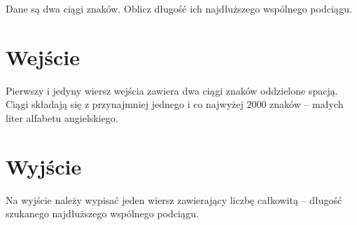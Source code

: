\documentclass{spiral-kurs}
\begin{document}
\makeheader
%
  
Dane są dwa ciągi znaków. Oblicz długość ich najdłuższego wspólnego podciągu.

    \section{Wejście}

Pierwszy i jedyny wiersz wejścia zawiera dwa ciągi znaków oddzielone spacją. Ciągi składają się z przynajmniej jednego i co najwyżej $2000$ znaków --
małych liter alfabetu angielskiego.

      
    \section{Wyjście}

Na wyjście należy wypisać jeden wiersz zawierający liczbę całkowitą -- długość szukanego najdłuższego wspólnego podciągu.


  
\end{document}

